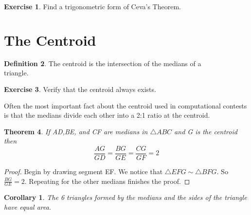 \documentclass[letterpaper]{article}
\theoremstyle{plain}
\newtheorem{thm}{Theorem}[section]
\newtheorem{corollary}{Corollary}[thm]
\theoremstyle{definition}
\newtheorem{definition}[thm]{Definition}
\newtheorem{exercise}[thm]{Exercise}
\theoremstyle{remark}
\begin{document}
    \begin{exercise}
        Find a trigonometric form of Ceva's Theorem.
    \end{exercise}
\section{The Centroid}
    \begin{mdframed}
        \begin{definition}
            The centroid is the intersection of the medians of a \\triangle.
       \end{definition} 
    \end{mdframed}
       
    \begin{exercise}
        Verify that the centroid always exists.
    \end{exercise}
    Often the most important fact about the centroid used in computational
    contests is that the medians divide each other into a 2:1 ratio at the centroid.
    \begin{mdframed}
        \begin{thm}
            If AD,BE, and CF are medians in $\triangle ABC$ and G is the centroid then $$\frac{AG}{GD}=\frac{BG}{GE}=\frac{CG}{GF}=2$$
        \end{thm}
    \end{mdframed}
    \begin{proof}
        Begin by drawing segment EF. We notice that $\triangle EFG \sim \triangle BFG$.
        So $\frac{BG}{GE} =2$. Repeating for the other medians finishes the proof.
    \end{proof}
    \begin{mdframed}
        \begin{corollary}
        \label{median ratios}
            The 6 triangles formed by the medians and the sides of the triangle have equal area.
        \end{corollary}
    \end{mdframed}
\end{document}
